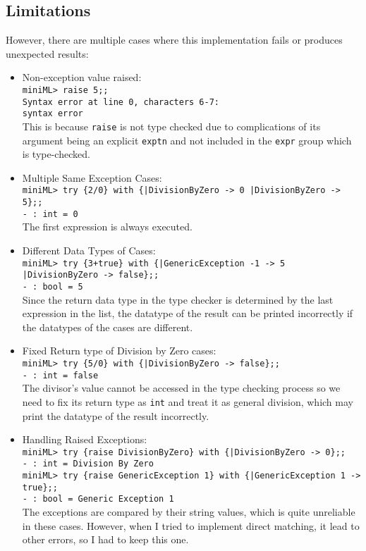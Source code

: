 \documentclass{article}
\begin{document}
    \subsection{Limitations}
    However, there are multiple cases where this implementation fails or produces unexpected results:
    \begin{itemize}
        \item Non-exception value raised:\\\texttt{miniML> raise 5;;\\Syntax error at line 0, characters 6-7:\\syntax error}\\This is because \texttt{raise} is not type checked due to complications of its argument being an explicit \texttt{exptn} and not included in the \texttt{expr} group which is type-checked.
        \item Multiple Same Exception Cases:\\\texttt{miniML> try \{2/0\} with \{|DivisionByZero -> 0 |DivisionByZero -> 5\};;\\- : int = 0}\\The first expression is always executed.
        \item Different Data Types of Cases:\\\texttt{miniML> try \{3+true\} with \{|GenericException -1 -> 5 |DivisionByZero -> false\};;\\- : bool = 5}\\Since the return data type in the type checker is determined by the last expression in the list, the datatype of the result can be printed incorrectly if the datatypes of the cases are different.
        \item Fixed Return type of Division by Zero cases:\\\texttt{miniML> try \{5/0\} with \{|DivisionByZero -> false\};;\\- : int = false}\\The divisor's value cannot be accessed in the type checking process so we need to fix its return type as \texttt{int} and treat it as general division, which may print the datatype of the result incorrectly.
        \item Handling Raised Exceptions: \\\texttt{miniML> try \{raise DivisionByZero\} with \{|DivisionByZero -> 0\};;\\- : int = Division By Zero\\miniML> try \{raise GenericException 1\} with \{|GenericException 1 -> true\};;\\- : bool = Generic Exception 1}\\The exceptions are compared by their string values, which is quite unreliable in these cases. However, when I tried to implement direct matching, it lead to other errors, so I had to keep this one.
    \end{itemize}
\end{document}

